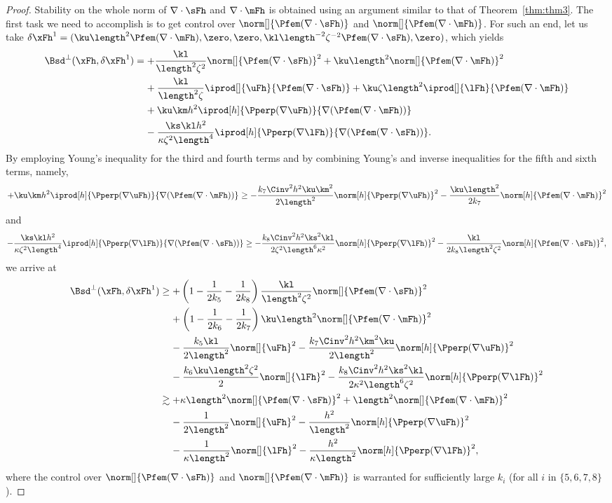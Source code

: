 \begin{proof}
Stability on the whole norm of $\nabla\cdot\sFh$ and $\nabla\cdot\mFh$ is obtained using an argument similar to that of Theorem~\ref{thm:thm3}.
The first task we need to accomplish is to get control over $\norm[]{\Pfem(\nabla\cdot\sFh)}$ and $\norm[]{\Pfem(\nabla\cdot\mFh)}$. For such an end, let us take $\delta\xFh^1 = (\ku\length^2\Pfem(\nabla\cdot\mFh),\zero,\zero,\kl\length^{-2}\zeta^{-2}\Pfem(\nabla\cdot\sFh),\zero)$, which yields 
\begin{align*}
\Bsd^\perp(\xFh,\delta\xFh^1)
&=
+\frac{\kl}{\length^2\zeta^2}\norm[]{\Pfem(\nabla\cdot\sFh)}^2
+\ku\length^2\norm[]{\Pfem(\nabla\cdot\mFh)}^2
\\
&\:\:\:\:\:
+\frac{\kl}{\length^2\zeta}\iprod[]{\uFh}{\Pfem(\nabla\cdot\sFh)}
+\ku\zeta\length^2\iprod[]{\lFh}{\Pfem(\nabla\cdot\mFh)}
\\
&\:\:\:\:\:
+\ku\km h^2\iprod[h]{\Pperp(\nabla\uFh)}{\nabla(\Pfem(\nabla\cdot\mFh))}
\\
&\:\:\:\:\:
-\frac{\ks\kl h^2}{\kappa\zeta^2\length^4}\iprod[h]{\Pperp(\nabla\lFh)}{\nabla(\Pfem(\nabla\cdot\sFh))}.
\end{align*}
By employing Young's inequality for the third and fourth terms and by combining Young's and inverse inequalities for the fifth and sixth terms, namely,
$$+\ku\km h^2\iprod[h]
{\Pperp(\nabla\uFh)}{\nabla(\Pfem(\nabla\cdot\mFh))}
\geq
-\frac{k_7\Cinv^2 h^2\ku\km^2}{2\length^2}\norm[h]{\Pperp(\nabla\uFh)}^2
- \frac{\ku\length^2}{2 k_7}\norm[h]{\Pfem(\nabla\cdot\mFh)}^2$$
and
$$-\frac{\ks\kl h^2}{\kappa\zeta^2\length^4}\iprod[h]
{\Pperp(\nabla\lFh)}{\nabla(\Pfem(\nabla\cdot\sFh))}
\geq
-\frac{k_8\Cinv^2 h^2\ks^2\kl}{2\zeta^2\length^6\kappa^2}\norm[h]{\Pperp(\nabla\lFh)}^2
-\frac{\kl}{2 k_8\length^2\zeta^2}\norm[h]{\Pfem(\nabla\cdot\sFh)}^2,$$
we arrive at
\begin{align*}
\Bsd^\perp(\xFh,\delta\xFh^1)
&\geq
+\left(1-\frac{1}{2 k_5}-\frac{1}{2 k_8}\right)\frac{\kl}{\length^2\zeta^2}\norm[]{\Pfem(\nabla\cdot\sFh)}^2\\
&\:\:\:\:\:
+\left(1-\frac{1}{2 k_6}-\frac{1}{2 k_7}\right)\ku\length^2\norm[]{\Pfem(\nabla\cdot\mFh)}^2\\
&\:\:\:\:\:
-\frac{k_5\kl}{2\length^2}\norm[]{\uFh}^2
-\frac{k_7\Cinv^2 h^2\km^2\ku}{2\length^2}\norm[h]{\Pperp(\nabla\uFh)}^2
\\
&\:\:\:\:\:
-\frac{k_6\ku\length^2\zeta^2}{2}\norm[]{\lFh}^2
-\frac{k_8\Cinv^2 h^2\ks^2\kl}{2\kappa^2\length^6\zeta^2}\norm[h]{\Pperp(\nabla\lFh)}^2
\\
&\gtrsim
+\kappa\length^2\norm[]{\Pfem(\nabla\cdot\sFh)}^2
+\length^2\norm[]{\Pfem(\nabla\cdot\mFh)}^2
\\
&\:\:\:\:\:
-\frac{1}{2\length^2}\norm[]{\uFh}^2
-\frac{h^2}{\length^2}\norm[h]{\Pperp(\nabla\uFh)}^2
\\
&\:\:\:\:\:
-\frac{1}{\kappa\length^2}\norm[]{\lFh}^2
-\frac{h^2}{\kappa\length^2}\norm[h]{\Pperp(\nabla\lFh)}^2,
\end{align*}
where the control over $\norm[]{\Pfem(\nabla\cdot\sFh)}$ and $\norm[]{\Pfem(\nabla\cdot\mFh)}$ is warranted for sufficiently large $k_i$ (for all $i$ in $\{5,6,7,8\}$).


\end{proof}
